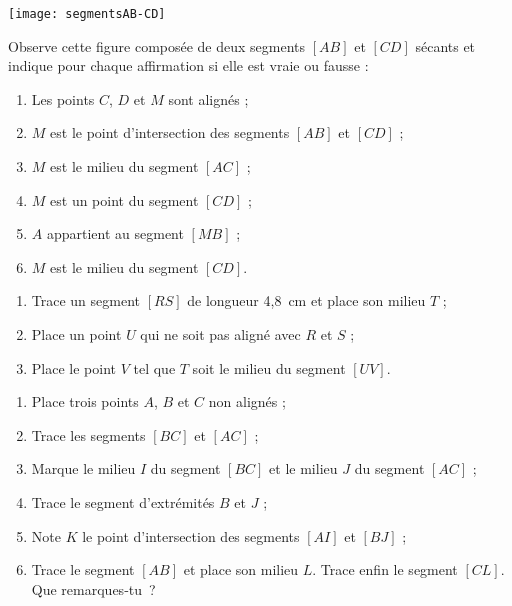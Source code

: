 \begin{exercice}
 \begin{center} \texttt{[image: segmentsAB-CD]}  \end{center}
 Observe cette figure composée de deux segments $[AB]$ et $[CD]$ sécants et indique pour chaque affirmation si elle est vraie ou fausse :
 \begin{enumerate}
  \item Les points $C$, $D$ et $M$ sont alignés ;
  \item $M$ est le point d'intersection des segments $[AB]$ et $[CD]$ ;
  \item $M$ est le milieu du segment $[AC]$ ;
  \item $M$ est un point du segment $[CD]$ ;
  \item $A$ appartient au segment $[MB]$ ;
  \item $M$ est le milieu du segment $[CD]$.
 \end{enumerate}
\end{exercice}


\begin{exercice}[Milieux]
\begin{enumerate} 
 \item Trace un segment $[RS]$ de longueur 4,8 cm et place son milieu $T$ ;
 \item Place un point $U$ qui ne soit pas aligné avec $R$ et $S$ ;
 \item Place le point $V$ tel que $T$ soit le milieu du segment $[UV]$.
 \end{enumerate}
\end{exercice}


\begin{exercice}[À construire]
\begin{enumerate} 
 \item Place trois points $A$, $B$ et $C$ non alignés ;
 \item Trace les segments $[BC]$ et $[AC]$ ;
 \item Marque le milieu $I$ du segment $[BC]$ et le milieu $J$ du segment $[AC]$ ;
 \item Trace le segment d'extrémités $B$ et $J$ ;
 \item Note $K$ le point d'intersection des segments $[AI]$ et $[BJ]$ ;
 \item Trace le segment $[AB]$ et place son milieu $L$. Trace enfin le segment $[CL]$. Que remarques‑tu ?
 \end{enumerate}
\end{exercice}


